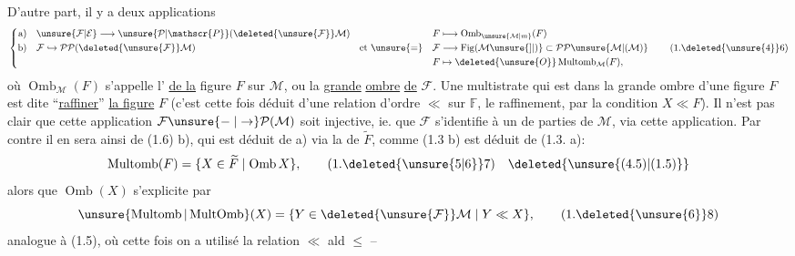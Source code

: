 D'autre part, il y a deux  applications
\[
\left\{\begin{aligned}
\text{a)}\quad &\unsure{\mathcal{F}|\mathcal{E}}\longrightarrow\unsure{\mathcal{P}|\mathscr{P}}(\deleted{\unsure{\mathcal{F}}}\mathcal{M})&
 F&\longmapsto\operatorname{Omb}_{\unsure{\mathcal{M}|m}}(F)\\
\text{b)}\quad &\mathcal{F}\hookrightarrow\mathcal{P}\mathcal{P}(\deleted{\unsure{\mathcal{F}}}\mathcal{M})&
 \text{et }\unsure{=}\quad\mathcal{F}&\longrightarrow\operatorname{Fig}(\mathcal{M}\unsure{]|)}\subset\mathcal{P}\mathcal{P}\unsure{\mathcal{M}|(\mathcal{M})}\\
&& F&\mapsto\deleted{\unsure{O}}\operatorname{Multomb}_{\mathcal{M}}(F),
\end{aligned}\right.\tag*{(1.\deleted{\unsure{4}}6)}
\]
où $\operatorname{Omb}_{\mathcal{M}}(F)$ s'appelle l'\uline{} \uline{de la} figure $F$ sur $\mathcal{M}$, ou la \uline{grande} \uline{ombre} \uline{de} $\mathcal{F}$. Une multistrate  qui est dans la grande ombre d'une figure $F$ est dite ``\uline{raffiner}'' \uline{la figure} $F$ (c'est cette fois déduit d'une relation d'ordre $\ll$ sur $\mathbb{F}$, le raffinement, par la condition $X\ll F$). Il n'est pas clair que cette application $\mathcal{F}\unsure{\relbar|\to}\mathcal{P}(\mathcal{M})$ soit injective, ie. que $\mathcal{F}$ s'identifie à un  de parties de $\mathcal{M}$, via cette application. Par contre il en sera ainsi de (1.6) b), qui est déduit de a) via la  de $\widetilde F$, comme (1.3 b) est déduit de (1.3. a):
\[
\operatorname{Multomb}(F)=\{X\in\widetilde F\mid\operatorname{Omb}X\},\tag*{(1.\deleted{\unsure{5|6}}7)\quad\deleted{\unsure{(4.5)|(1.5)}}}
\]
alors que $\operatorname{Omb}(X)$ s'explicite par
\[
\unsure{\operatorname{Multomb}|\operatorname{MultOmb}}(X)=\{Y\in\deleted{\unsure{\mathcal{F}}}\mathcal{M}\mid Y\ll X\},\tag*{(1.\deleted{\unsure{6}}8)}
\]
analogue à (1.5), où cette fois on a utilisé la relation  $\ll$ ald $\leq$ -- 
